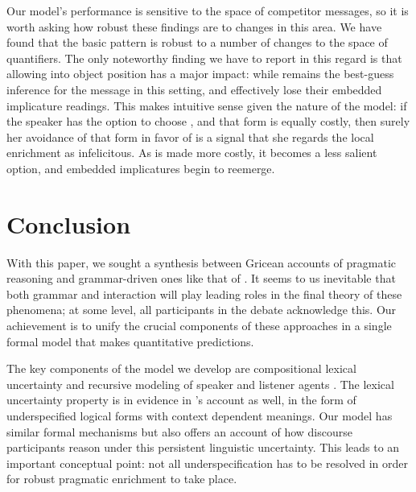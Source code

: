\documentclass[leqno,12pt]{article}
\begin{document}
 Our model's performance is sensitive to the space of competitor
messages, so it is worth asking how robust these findings are to
changes in this area. We have found that the basic pattern is robust
to a number of changes to the space of quantifiers.  
%
%
The only noteworthy finding we have to report in this regard is that
allowing  into object position has a major impact:
while  remains the best-guess inference for the message
 in this setting,  and
 effectively lose their embedded implicature
readings.  This makes intuitive sense given the nature of the model:
if the speaker has the option to choose ,
and that form is equally costly, then surely her avoidance of that
form in favor of  is a signal that she regards
the local enrichment as infelicitous. As  is made more
costly, it becomes a less salient option, and embedded implicatures
begin to reemerge.


\section{Conclusion}\label{sec:conclusion}

With this paper, we sought a synthesis between Gricean accounts of
pragmatic reasoning and grammar-driven ones like that of
\citet{ChierchiaFoxSpector08}. It seems to us inevitable that both
grammar and interaction will play leading roles in the final theory of
these phenomena; at some level, all participants in the debate
acknowledge this. Our achievement is to unify the crucial components
of these approaches in a single formal model that makes quantitative
predictions.

The key components of the model we develop are compositional lexical
uncertainty and recursive modeling of speaker and listener agents
\citep{Bergen:Levy:Goodman:2014}. The lexical uncertainty property is
in evidence in \citeauthor{ChierchiaFoxSpector08}'s account as well,
in the form of underspecified logical forms with context dependent
meanings. Our model has similar formal mechanisms but also offers an
account of how discourse participants reason under this persistent
linguistic uncertainty. This leads to an important conceptual point:
not all underspecification has to be resolved in order for robust
pragmatic enrichment to take place.
\end{document}
